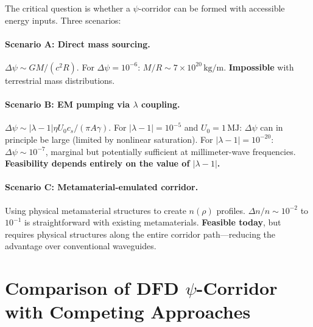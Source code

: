 \documentclass[11pt,a4paper]{article}
\begin{document}
The critical question is whether a $\psi$-corridor can be formed
with accessible energy inputs. Three scenarios:

\paragraph{Scenario A: Direct mass sourcing.}
$\Delta\psi \sim GM/(c^2 R)$. For $\Delta\psi = 10^{-6}$:
$M/R \sim 7 \times 10^{20}\,\text{kg/m}$. \textbf{Impossible}
with terrestrial mass distributions.

\paragraph{Scenario B: EM pumping via $\lambda$ coupling.}
$\Delta\psi \sim |\lambda-1| \eta U_0 c_s / (\pi A \gamma)$.
For $|\lambda-1| = 10^{-5}$ and $U_0 = 1\,\text{MJ}$:
$\Delta\psi$ can in principle be large (limited by nonlinear
saturation). For $|\lambda-1| = 10^{-20}$: $\Delta\psi \sim 10^{-7}$,
marginal but potentially sufficient at millimeter-wave frequencies.
\textbf{Feasibility depends entirely on the value of $|\lambda-1|$.}

\paragraph{Scenario C: Metamaterial-emulated corridor.}
Using physical metamaterial structures to create $n(\rho)$ profiles.
$\Delta n / n \sim 10^{-2}$ to $10^{-1}$ is straightforward with
existing metamaterials. \textbf{Feasible today}, but requires
physical structures along the entire corridor path---reducing
the advantage over conventional waveguides.

\section{Comparison of DFD $\psi$-Corridor with Competing Approaches}
\end{document}
